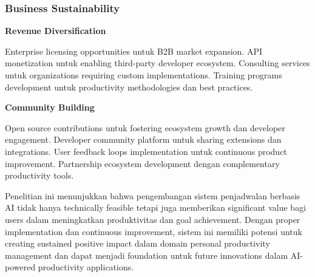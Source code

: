 \subsubsection{Business Sustainability}

\textbf{Revenue Diversification}

Enterprise licensing opportunities untuk B2B market expansion. API monetization untuk enabling third-party developer ecosystem. Consulting services untuk organizations requiring custom implementations. Training programs development untuk productivity methodologies dan best practices.

\textbf{Community Building}

Open source contributions untuk fostering ecosystem growth dan developer engagement. Developer community platform untuk sharing extensions dan integrations. User feedback loops implementation untuk continuous product improvement. Partnership ecosystem development dengan complementary productivity tools.

Penelitian ini menunjukkan bahwa pengembangan sistem penjadwalan berbasis AI tidak hanya technically feasible tetapi juga memberikan significant value bagi users dalam meningkatkan produktivitas dan goal achievement. Dengan proper implementation dan continuous improvement, sistem ini memiliki potensi untuk creating sustained positive impact dalam domain personal productivity management dan dapat menjadi foundation untuk future innovations dalam AI-powered productivity applications.